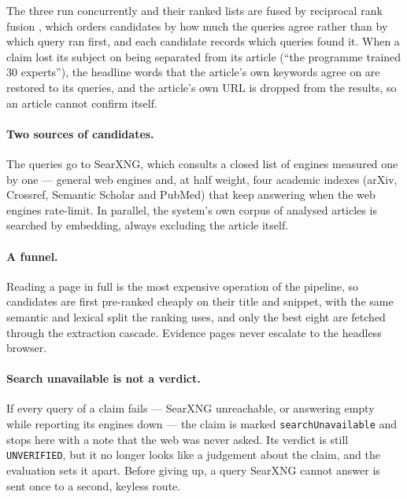 The three run concurrently and their ranked lists are fused by
reciprocal rank fusion \cite{cormack2009rrf}, which orders candidates by
how much the queries agree rather than by which query ran first, and
each candidate records which queries found it. When a claim lost its
subject on being separated from its article (``the programme trained
30 experts''), the headline words that the article's own keywords agree
on are restored to its queries, and the article's own URL is dropped
from the results, so an article cannot confirm itself.

\paragraph{Two sources of candidates.} The queries go to SearXNG, which
consults a closed list of engines measured one by one --- general web
engines and, at half weight, four academic indexes (arXiv, Crossref,
Semantic Scholar and PubMed) that keep answering when the web engines
rate-limit. In parallel, the system's own corpus of analysed articles is
searched by embedding, always excluding the article itself.

\paragraph{A funnel.} Reading a page in full is the most expensive
operation of the pipeline, so candidates are first pre-ranked cheaply
on their title and snippet, with the same semantic and lexical split
the ranking uses, and only the best eight are fetched through the
extraction cascade. Evidence pages never escalate to the headless
browser.

\paragraph{Search unavailable is not a verdict.} If every query of a
claim fails --- SearXNG unreachable, or answering empty while reporting
its engines down --- the claim is marked \texttt{searchUnavailable}
and stops here with a note that the web was never asked. Its verdict is
still \texttt{UNVERIFIED}, but it no longer looks like a judgement about
the claim, and the evaluation sets it apart. Before giving up, a query
SearXNG cannot answer is sent once to a second, keyless route.
